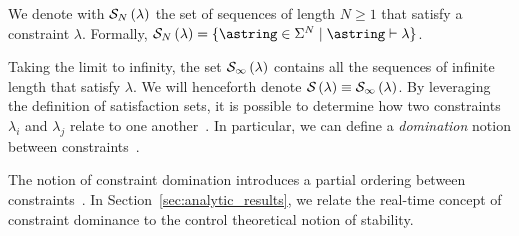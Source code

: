 \begin{definition}%
    \label{def:satisfaction}%
    We denote with $\mathcal{S}_{N}\left( \lambda \right)$ the set of sequences of length $N \geq 1$ that satisfy a constraint $\lambda$.
    Formally, $\sset{N}{\lambda} = \{ \astring \in \Sigma^N \mid \astring \vdash \lambda \}$.
\end{definition}
Taking the limit to infinity, the set $\mathcal{S}_{\infty}\left( \lambda \right)$ contains all the sequences of infinite length that satisfy $\lambda$.
We will henceforth denote $\mathcal{S}_{}\left( \lambda \right) \equiv \mathcal{S}_{\infty}\left( \lambda \right)$.
%
By leveraging the definition of satisfaction sets, it is possible to
determine how two constraints $\lambda_i$ and $\lambda_j$ relate to
one another~\cite{Bernat:2001, Wu:2020}. In particular, we can define
a \emph{domination} notion between constraints~\cite{Bernat:2001}.

\begin{definition}%
    \label{def:domination}%
\end{definition}
The notion of constraint domination introduces a partial ordering between constraints~\cite{Bernat:2001}.  In Section~\ref{sec:analytic_results}, we relate the real-time concept of constraint dominance to the control theoretical notion of stability.


